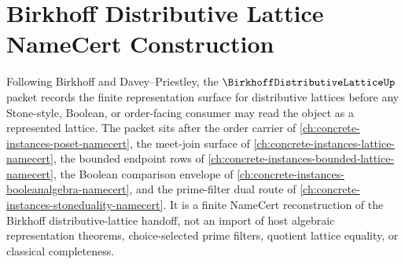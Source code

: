 \chapter{Birkhoff Distributive Lattice NameCert Construction}
\label{ch:concrete-instances-birkhoff-distributive-lattice-namecert}

Following Birkhoff and Davey--Priestley, the $\BirkhoffDistributiveLatticeUp$ packet records the finite representation surface for distributive lattices before any Stone-style, Boolean, or order-facing consumer may read the object as a represented lattice. The packet sits after the order carrier of \autoref{ch:concrete-instances-poset-namecert}, the meet-join surface of \autoref{ch:concrete-instances-lattice-namecert}, the bounded endpoint rows of \autoref{ch:concrete-instances-bounded-lattice-namecert}, the Boolean comparison envelope of \autoref{ch:concrete-instances-booleanalgebra-namecert}, and the prime-filter dual route of \autoref{ch:concrete-instances-stoneduality-namecert}. It is a finite NameCert reconstruction of the Birkhoff distributive-lattice handoff, not an import of host algebraic representation theorems, choice-selected prime filters, quotient lattice equality, or classical completeness.

